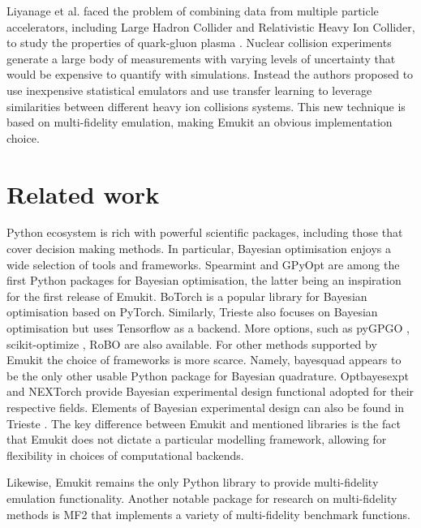 Liyanage et al. faced the problem of combining data from multiple particle accelerators, including Large Hadron Collider and Relativistic Heavy Ion Collider, to study the properties of quark-gluon plasma \cite{PhysRevC105034910}. Nuclear collision experiments generate a large body of measurements with varying levels of uncertainty that would be expensive to quantify with simulations. Instead the authors proposed to use inexpensive statistical emulators and use transfer learning to leverage similarities between different heavy ion collisions systems. This new technique is based on multi-fidelity emulation, making Emukit an obvious implementation choice.

\section{Related work}
Python ecosystem is rich with powerful scientific packages, including those that cover decision making methods. In particular, Bayesian optimisation enjoys a wide selection of tools and frameworks. Spearmint \cite{snoek2012practical} and GPyOpt \cite{gpyopt2016} are among the first Python packages for Bayesian optimisation, the latter being an inspiration for the first release of Emukit. BoTorch \cite{balandat2020botorch} is a popular library for Bayesian optimisation based on PyTorch. Similarly, Trieste \cite{picheny2023trieste} also focuses on Bayesian optimisation but uses Tensorflow as a backend. More options, such as pyGPGO \cite{jimenez2017pygpgo}, scikit-optimize \cite{louppe2017bayesian}, RoBO \cite{klein-bayesopt17} are also available. For other methods supported by Emukit the choice of frameworks is more scarce. Namely, bayesquad \cite{Charles2013} appears to be the only other usable Python package for Bayesian quadrature. Optbayesexpt \cite{mcmichael2021optbayesexpt} and NEXTorch \cite{wang2021nextorch} provide Bayesian experimental design functional adopted for their respective fields. Elements of Bayesian experimental design can also be found in Trieste \cite{picheny2023trieste}. The key difference between Emukit and mentioned libraries is the fact that Emukit does not dictate a particular modelling framework, allowing for flexibility in choices of computational backends.

Likewise, Emukit remains the only Python library to provide multi-fidelity emulation functionality. Another notable package for research on multi-fidelity methods is MF2 \cite{vanRijn2020} that implements a variety of multi-fidelity benchmark functions.

